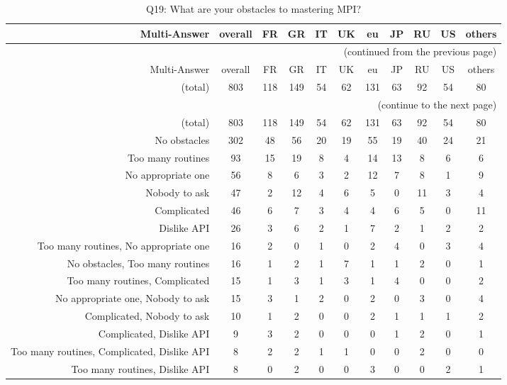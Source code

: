 \clearpage%
{\footnotesize\begin{landscape}%
\begin{longtable}[htb]{r|c|c|c|c|c|c|c|c|c|c}%
\caption{Q19: What are your obstacles to mastering MPI?}%
\label{tab:Q19-mans} \\%
\hline%
Multi-Answer & overall & FR & GR & IT & UK & eu & JP & RU & US & others \\
 \hline%
\endfirsthead%
\multicolumn{11}{r}{(continued from the previous page)}\\%
\hline%
Multi-Answer & overall & FR & GR & IT & UK & eu & JP & RU & US & others \\
 \hline%
\endhead%
\hline%
(total) & 803 & 118 & 149 & 54 & 62 & 131 & 63 & 92 & 54 & 80 \\%
\hline%
\multicolumn{11}{r}{(continue to the next page)}\\%
\endfoot%
\hline%
(total) & 803 & 118 & 149 & 54 & 62 & 131 & 63 & 92 & 54 & 80 \\%
\hline%
\endlastfoot%
\hline%
{No obstacles} & 302 & 48 & 56 & 20 & 19 & 55 & 19 & 40 & 24 & 21 \\%
{Too many routines} & 93 & 15 & 19 & 8 & 4 & 14 & 13 & 8 & 6 & 6 \\%
{No appropriate one} & 56 & 8 & 6 & 3 & 2 & 12 & 7 & 8 & 1 & 9 \\%
{Nobody to ask} & 47 & 2 & 12 & 4 & 6 & 5 & 0 & 11 & 3 & 4 \\%
{Complicated} & 46 & 6 & 7 & 3 & 4 & 4 & 6 & 5 & 0 & 11 \\%
{Dislike API} & 26 & 3 & 6 & 2 & 1 & 7 & 2 & 1 & 2 & 2 \\%
{Too many routines, No appropriate one} & 16 & 2 & 0 & 1 & 0 & 2 & 4 & 0 & 3 & 4 \\%
{No obstacles, Too many routines} & 16 & 1 & 2 & 1 & 7 & 1 & 1 & 2 & 0 & 1 \\%
{Too many routines, Complicated} & 15 & 1 & 3 & 1 & 3 & 1 & 4 & 0 & 0 & 2 \\%
{No appropriate one, Nobody to ask} & 15 & 3 & 1 & 2 & 0 & 2 & 0 & 3 & 0 & 4 \\%
{Complicated, Nobody to ask} & 10 & 1 & 2 & 0 & 0 & 2 & 1 & 1 & 1 & 2 \\%
{Complicated, Dislike API} & 9 & 3 & 2 & 0 & 0 & 0 & 1 & 2 & 0 & 1 \\%
{Too many routines, Complicated, Dislike API} & 8 & 2 & 2 & 1 & 1 & 0 & 0 & 2 & 0 & 0 \\%
{Too many routines, Dislike API} & 8 & 0 & 2 & 0 & 0 & 3 & 0 & 0 & 2 & 1 \\%

\end{longtable}
\end{landscape}}
